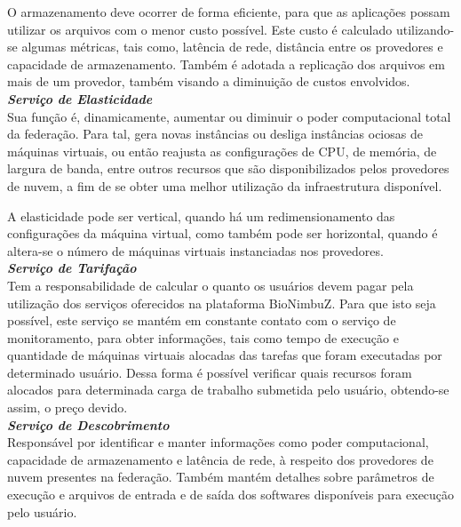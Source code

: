 O armazenamento deve ocorrer de forma eficiente, para que as aplicações possam utilizar os arquivos com o menor custo possível. Este custo é calculado utilizando-se algumas métricas, tais como, latência de rede, distância entre os provedores e capacidade de armazenamento. Também é adotada a replicação dos arquivos em mais de um provedor, também visando a diminuição de custos envolvidos. \\

\noindent
\textbf{\textit{Serviço de Elasticidade}} \\

\noindent
Sua função é, dinamicamente, aumentar ou diminuir o poder computacional total da federação. Para tal, gera novas instâncias ou desliga instâncias ociosas de máquinas virtuais, ou então reajusta as configurações de CPU, de memória, de largura de banda, entre outros recursos que são disponibilizados pelos provedores de nuvem, a fim de se obter uma melhor utilização da infraestrutura disponível. 

A elasticidade pode ser vertical, quando há um redimensionamento das configurações da máquina virtual, como também pode ser horizontal, quando é altera-se o número de máquinas virtuais instanciadas nos provedores. \\

\noindent
\textbf{\textit{Serviço de Tarifação}} \\

\noindent
Tem a responsabilidade de calcular o quanto os usuários devem pagar pela utilização dos serviços oferecidos na plataforma BioNimbuZ. Para que isto seja possível, este serviço se mantém em constante contato com o serviço de monitoramento, para obter informações, tais como tempo de execução e quantidade de máquinas virtuais alocadas das tarefas que foram executadas por determinado usuário. Dessa forma é possível verificar quais recursos foram alocados para determinada carga de trabalho submetida pelo usuário, obtendo-se assim, o preço devido.\\ 

\noindent
\textbf{\textit{Serviço de Descobrimento}} \\

\noindent
Responsável por identificar e manter informações como poder computacional, capacidade de armazenamento e latência de rede, à respeito dos provedores de nuvem presentes na federação. Também mantém detalhes sobre parâmetros de execução e arquivos de entrada e de saída dos softwares disponíveis para execução pelo usuário. 

